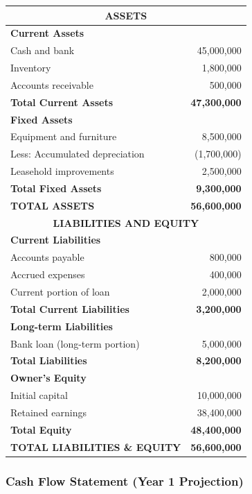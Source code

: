 \documentclass[a4paper,12pt]{article}
\begin{document}
\begin{tabular}{|l|r|}
\hline
\multicolumn{2}{|c|}{\textbf{ASSETS}} \\
\hline
\textbf{Current Assets} & \\
Cash and bank & 45,000,000 \\
Inventory & 1,800,000 \\
Accounts receivable & 500,000 \\
\hline
\textbf{Total Current Assets} & \textbf{47,300,000} \\
\hline
\textbf{Fixed Assets} & \\
Equipment and furniture & 8,500,000 \\
Less: Accumulated depreciation & (1,700,000) \\
Leasehold improvements & 2,500,000 \\
\hline
\textbf{Total Fixed Assets} & \textbf{9,300,000} \\
\hline
\textbf{TOTAL ASSETS} & \textbf{56,600,000} \\
\hline
\multicolumn{2}{|c|}{\textbf{LIABILITIES AND EQUITY}} \\
\hline
\textbf{Current Liabilities} & \\
Accounts payable & 800,000 \\
Accrued expenses & 400,000 \\
Current portion of loan & 2,000,000 \\
\hline
\textbf{Total Current Liabilities} & \textbf{3,200,000} \\
\hline
\textbf{Long-term Liabilities} & \\
Bank loan (long-term portion) & 5,000,000 \\
\hline
\textbf{Total Liabilities} & \textbf{8,200,000} \\
\hline
\textbf{Owner's Equity} & \\
Initial capital & 10,000,000 \\
Retained earnings & 38,400,000 \\
\hline
\textbf{Total Equity} & \textbf{48,400,000} \\
\hline
\textbf{TOTAL LIABILITIES \& EQUITY} & \textbf{56,600,000} \\
\hline
\end{tabular}

\subsubsection{Cash Flow Statement (Year 1 Projection)}
\end{document}
